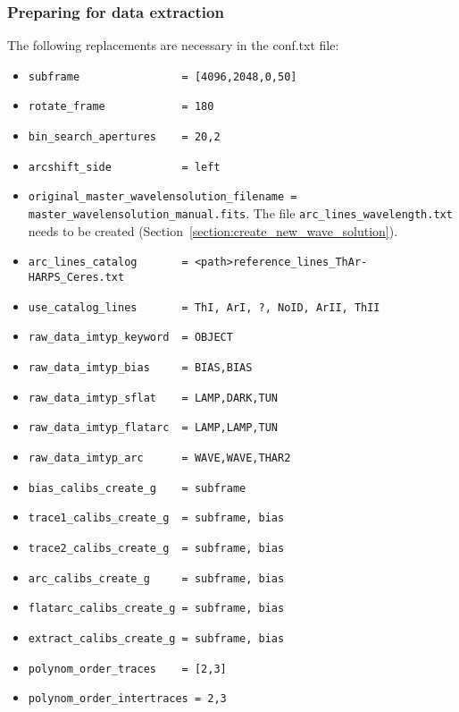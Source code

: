 \documentclass[10pt,a4paper]{article}
\begin{document}
\subsubsection{Preparing for data extraction}

\noindent The following replacements are necessary in the conf.txt file:
\begin{itemize}\setlength\itemsep{0em}
  \small
  \item \verb|subframe                = [4096,2048,0,50]|
  \item \verb|rotate_frame            = 180|
  \item \verb|bin_search_apertures    = 20,2|
  \item \verb|arcshift_side           = left|
  \item \verb|original_master_wavelensolution_filename = master_wavelensolution_manual.fits|. The file \verb|arc_lines_wavelength.txt| needs to be created (Section~\ref{section:create_new_wave_solution}).
  \item \verb|arc_lines_catalog 	  = <path>reference_lines_ThAr-HARPS_Ceres.txt|
  \item \verb|use_catalog_lines 	  = ThI, ArI, ?, NoID, ArII, ThII|
  \item \verb|raw_data_imtyp_keyword  = OBJECT|
  \item \verb|raw_data_imtyp_bias     = BIAS,BIAS|
  \item \verb|raw_data_imtyp_sflat    = LAMP,DARK,TUN|
  \item \verb|raw_data_imtyp_flatarc  = LAMP,LAMP,TUN|
  \item \verb|raw_data_imtyp_arc      = WAVE,WAVE,THAR2|
  \item \verb|bias_calibs_create_g    = subframe|
  \item \verb|trace1_calibs_create_g  = subframe, bias|
  \item \verb|trace2_calibs_create_g  = subframe, bias|
  \item \verb|arc_calibs_create_g     = subframe, bias|
  \item \verb|flatarc_calibs_create_g = subframe, bias|
  \item \verb|extract_calibs_create_g = subframe, bias|
  \item \verb|polynom_order_traces    = [2,3]|
  \item \verb|polynom_order_intertraces = 2,3|
\end{itemize}
\end{document}
